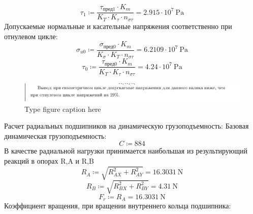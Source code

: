 \documentclass{article}
\newcommand{\defeq}{\coloneq} %
\begin{document}
\begin{equation*}
\textit{τ}_{\textit{1}} \defeq \frac{\textit{τ}_{\textit{пред1}} \cdot K_{m}}{K_{T} \cdot K_{τ} \cdot n_{στ}} = {2.915 \cdot 10^{7} \: \mathrm{Pa}}
\end{equation*}
\colorbox[HTML]{000000}{Допускаемые нормальные и касательные напряжения соответственно при отнулевом цикле:}\newline
\begin{equation*}
\textit{σ}_{\textit{u0}} \defeq \frac{\textit{σ}_{\textit{пред0}} \cdot K_{m}}{K_{σ} \cdot K_{T} \cdot n_{στ}} = {6.2109 \cdot 10^{7} \: \mathrm{Pa}}
\end{equation*}
\begin{equation*}
\textit{τ}_{\textit{0}} \defeq \frac{\textit{τ}_{\textit{пред0}} \cdot K_{m}}{K_{T} \cdot K_{τ} \cdot n_{στ}} = {4.24 \cdot 10^{7} \: \mathrm{Pa}}
\end{equation*}
\begin{figure}[h!]
 \begin{center}
  \includegraphics[max width=\textwidth]{calculations/538.png}
  \caption{Type figure caption here}
  \label{fig:538}
 \end{center}
\end{figure}
\colorbox[HTML]{000000}{Расчет радиальных подшипников на динамическую грузоподъемность:}\newline
\colorbox[HTML]{000000}{Базовая динамическая грузоподъемность:}\newline
\begin{equation*}
C \defeq 884
\end{equation*}
\colorbox[HTML]{000000}{В качестве радиальной нагрузки принимается наибольшая из результирующий реакций в опорах R,A и R,B}\newline
\begin{equation*}
R_{A} \defeq \sqrt{R_{AX}^{2}+R_{AY}^{2}} = {16.3031 \: \mathrm{N}}
\end{equation*}
\begin{equation*}
R_{B} \defeq \sqrt{R_{BX}^{2}+R_{BY}^{2}} = {4.31 \: \mathrm{N}}
\end{equation*}
\begin{equation*}
F_{r} \defeq R_{A} = {16.3031 \: \mathrm{N}}
\end{equation*}
\colorbox[HTML]{000000}{Коэффициент вращения, при вращении внутреннего кольца подшипника:}\newline
\end{document}
